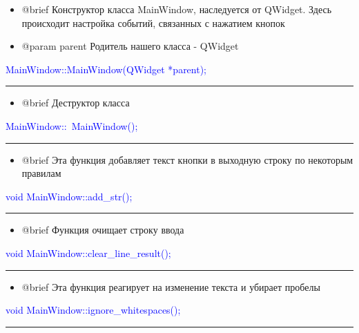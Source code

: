 \documentclass{article}
\begin{document}
\begin{itemize}
\item @brief Конструктор класса MainWindow, наследуется от QWidget. Здесь происходит настройка событий, связанных с нажатием кнопок
\item @param parent Родитель нашего класса - QWidget
\end{itemize}

\textcolor{blue}{MainWindow::MainWindow(QWidget *parent);}

{\color{red} \rule{\linewidth}{0.5mm}}

\begin{itemize}

\item @brief Деструктор класса

\end{itemize}

\textcolor{blue}{MainWindow::~MainWindow();}

{\color{red} \rule{\linewidth}{0.5mm}}


\begin{itemize}

\item @brief Эта функция добавляет текст кнопки в выходную строку по некоторым правилам

\end{itemize}

\textcolor{blue}{void MainWindow::add\_str();}

{\color{red} \rule{\linewidth}{0.5mm}}


\begin{itemize}

\item @brief Функция очищает строку ввода

\end{itemize}

\textcolor{blue}{void MainWindow::clear\_line\_result();}

{\color{red} \rule{\linewidth}{0.5mm}}


\begin{itemize}

\item @brief Эта функция реагирует на изменение текста и убирает пробелы

\end{itemize}

\textcolor{blue}{void MainWindow::ignore\_whitespaces();}

{\color{red} \rule{\linewidth}{0.5mm}}
\end{document}
